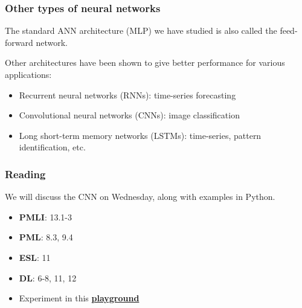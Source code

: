 \documentclass[smaller]{beamer}
\begin{document}
\begin{frame}
  \frametitle{Other types of neural networks}
  \pause

  The standard ANN architecture (MLP) we have studied is also called the feed-forward network.

  \medskip
  
  Other architectures have been shown to give better performance for various applications: \pause

  \medskip
  \begin{itemize}[<+->]
  \item Recurrent neural networks (RNNs): time-series forecasting

  \item Convolutional neural networks (CNNs): image classification

  \item Long short-term memory networks (LSTMs): time-series, pattern identification, etc.
  \end{itemize}

\end{frame}

\begin{frame}
  \frametitle{Reading}
 We will discuss the CNN on Wednesday, along with examples in Python.
 \begin{itemize}[<+->]
 \item \textbf{PMLI}: 13.1-3
 \item \textbf{PML}: 8.3, 9.4
 \item \textbf{ESL}: 11
 \item \textbf{DL}: 6-8, 11, 12 
 \item Experiment in this \href{http://playground.tensorflow.org}{\bl \bf playground}
  \end{itemize}
\end{frame}
 
\end{document}
